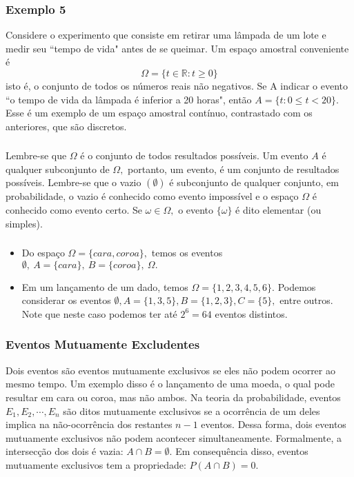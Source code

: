 \documentclass[14pt,aspectratio=1610]{beamer}
\begin{document}
\begin{frame}{}
\frametitle{Exemplo 5}
\begin{block}{}
\justifying
Considere o experimento que consiste em retirar uma lâmpada de um lote e medir seu ``tempo de vida" antes de se queimar. Um espaço amostral conveniente é
$$\Omega=\{t\in \mathds{R}:t\geq 0\}$$
isto é, o conjunto de todos os números reais não negativos. Se A indicar o evento ``o
tempo de vida da lâmpada é inferior a 20 horas", então $A = \{t : 0\leq t<20\}.$ Esse é um exemplo de um espaço amostral contínuo, contrastado com os anteriores, que
são discretos.
\end{block}
\end{frame}

\begin{frame}{}
\frametitle{}
\begin{block}{}
\justifying
Lembre-se que $\Omega$ é o conjunto de todos resultados possíveis. Um evento $A$ é qualquer subconjunto de $\Omega,$ portanto, um evento, é um conjunto de resultados possíveis. Lembre-se que o vazio $(\emptyset)$ é subconjunto de qualquer conjunto, em probabilidade, o vazio é conhecido como evento impossível e o espaço $\Omega$ é conhecido como evento certo. Se $\omega \in \Omega,$ o evento $\{\omega\}$ é dito elementar (ou simples).
\end{block}
\end{frame}

\begin{frame}{}
\frametitle{}
\begin{block}{}
\justifying
\begin{itemize}
\item Do espaço $\Omega=\{cara, coroa\},$ temos os eventos $\emptyset,\ A=\{cara\},\ B=\{coroa\},\ \Omega.$ \pause
\item Em um lançamento de um dado, temos $\Omega=\{1,2,3,4,5,6\}.$ Podemos considerar os eventos $\emptyset, A=\{1,3,5\}, B=\{1,2,3\}, C=\{5\},$ entre outros. Note que neste caso podemos ter até $2^{6}=64$ eventos distintos.
\end{itemize}
\end{block}
\end{frame}

\begin{frame}{}
\frametitle{Eventos Mutuamente Excludentes}
\begin{block}{}
\justifying
Dois eventos são eventos mutuamente exclusivos se eles não podem ocorrer ao mesmo tempo. Um exemplo disso é o lançamento de uma moeda, o qual pode resultar em cara ou coroa, mas não ambos. Na teoria da probabilidade, eventos $E_{1}, E_{2},\cdots, E_{n}$ são ditos mutuamente exclusivos se a ocorrência de um deles implica na não-ocorrência dos restantes $n - 1$ eventos. Dessa forma, dois eventos mutuamente exclusivos não podem acontecer simultaneamente. Formalmente, a intersecção dos dois é vazia: 
$A\cap B =\emptyset.$ Em consequência disso, eventos mutuamente exclusivos tem a propriedade: $P(A\cap B) = 0.$
\end{block}
\end{frame}
\end{document}
